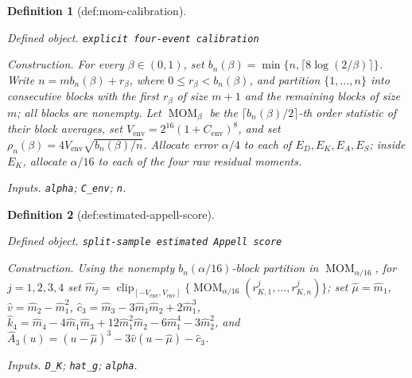 \documentclass{article}
\newtheorem{definition}{Definition}
\begin{document}
\begin{definition}[def:mom-calibration]\label{def:mom-calibration}
\par\smallskip\noindent\emph{Defined object.} \texttt{explicit four-\allowbreak{}event calibration}
\par\smallskip\noindent\emph{Construction.} For every \(\beta\in(0,1)\), set \(b_n(\beta)=\min\{n,\lceil8\log(2/\beta)\rceil\}\). Write \(n=m b_n(\beta)+r_\beta\), where \(0\le r_\beta<b_n(\beta)\), and partition \(\{1,\ldots,n\}\) into consecutive blocks with the first \(r_\beta\) of size \(m+1\) and the remaining blocks of size \(m\); all blocks are nonempty. Let \(\operatorname{MOM}_{\beta}\) be the \(\lceil b_n(\beta)/2\rceil\)-th order statistic of their block averages, set \(V_{\mathrm{env}}=2^{16}(1+C_{\mathrm{env}})^8\), and set \(\rho_n(\beta)=4V_{\mathrm{env}}\sqrt{b_n(\beta)/n}\). Allocate error \(\alpha/4\) to each of \(E_D,E_K,E_A,E_S\); inside \(E_K\), allocate \(\alpha/16\) to each of the four raw residual moments.
\par\smallskip\noindent\emph{Inputs.} \texttt{alpha}; \texttt{C\_\allowbreak{}env}; \texttt{n}.
\end{definition}

\begin{definition}[def:estimated-appell-score]\label{def:estimated-appell-score}
\par\smallskip\noindent\emph{Defined object.} \texttt{split-\allowbreak{}sample estimated Appell score}
\par\smallskip\noindent\emph{Construction.} Using the nonempty \(b_n(\alpha/16)\)-block partition in \(\operatorname{MOM}_{\alpha/16}\), for \(j=1,2,3,4\) set \(\widehat m_j=\operatorname{clip}_{[-V_{\mathrm{env}},V_{\mathrm{env}}]}\{\operatorname{MOM}_{\alpha/16}(r_{K,1}^j,\ldots,r_{K,n}^j)\}\); set \(\widehat\mu=\widehat m_1\), \(\widehat v=\widehat m_2-\widehat m_1^2\), \(\widehat c_3=\widehat m_3-3\widehat m_1\widehat m_2+2\widehat m_1^3\), \(\widehat k_4=\widehat m_4-4\widehat m_1\widehat m_3+12\widehat m_1^2\widehat m_2-6\widehat m_1^4-3\widehat m_2^2\), and \(\widehat A_3(u)=(u-\widehat\mu)^3-3\widehat v(u-\widehat\mu)-\widehat c_3\).
\par\smallskip\noindent\emph{Inputs.} \texttt{D\_\allowbreak{}K}; \texttt{hat\_\allowbreak{}g}; \texttt{alpha}.
\end{definition}
\end{document}
